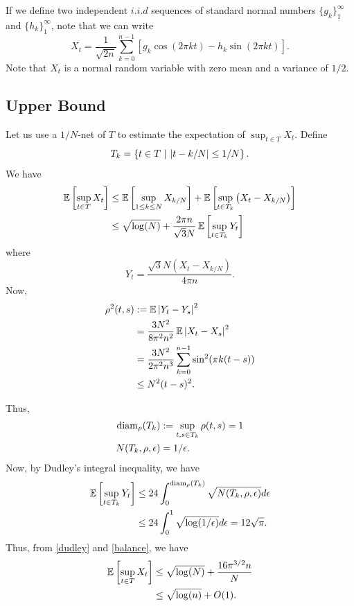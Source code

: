 If we define two independent $i.i.d$ sequences of standard normal numbers $\{ g_k\}_1^\infty$ and $\{h_k\}_1^\infty$, note that we can write
\begin{equation}
X_t = \frac{1}{\sqrt{2 n}} \sum_{k=0}^{n-1} \left[ g_k \cos(2 \pi k t) - h_k \sin(2\pi k t) \right].
\end{equation}
Note that $X_t$ is a normal random variable with zero mean and a variance of $1/2$. 

\subsection{Upper Bound}
Let us use a $1/N$-net of $T$ to estimate the expectation of  $\sup_{t \in T} {X_t}$. Define
\begin{equation}
T_k = \left\{t \in T ~ \middle| ~ \left|t-k/N\right| \leq 1/N \right\}.
\end{equation}
We have
\begin{align}
\operatorname{\mathbb{E}}\left[\sup_{t \in T} X_t \right] & \leq \operatorname{\mathbb{E}}\left[\sup_{1 \leq k \leq N} X_{k/N} \right] + \operatorname{\mathbb{E}}\left[\sup_{t \in T_k} \left(X_{t} - X_{k/N}\right) \right]\\
& \leq \sqrt{\log(N)} + \frac{2 \pi n}{\sqrt{3}N} \operatorname{\mathbb{E}}\left[\sup_{t \in T_k} Y_t \right]\label{balance}
\end{align}
where 
\begin{equation}
Y_t = \frac{\sqrt{3} N  \left(X_t - X_{k/N}\right)}{4 \pi n}.
\end{equation}
Now,
\begin{align}
\rho^2(t,s) & := \operatorname{\mathbb{E}} \left|Y_t - Y_s\right|^2\\
& = \frac{3 N^2}{8 \pi^2 n^2} \operatorname{\mathbb{E}} \left|X_t - X_s\right|^2\\
& = \frac{3 N^2}{2 \pi^2 n^3} \sum_{k=0}^{n-1}{\sin^2(\pi k (t - s))}\\
& \leq N^2 (t-s)^2.
\end{align}

Thus,
\begin{align}
\operatorname{diam}_\rho(T_k) &:= \sup_{t,s  \in T_k}\rho(t,s) = 1\\
N(T_k, \rho, \epsilon) & = 1/\epsilon.
\end{align}
Now, by Dudley's integral inequality, we have
\begin{align}
\operatorname{\mathbb{E}}\left[\sup_{t \in T_k} Y_t \right] & \leq 24 \int_0^{\operatorname{diam}_\rho(T_k)} \sqrt{N(T_k, \rho, \epsilon)} d\epsilon\\
 & \leq 24 \int_0^1 \sqrt{\log(1/\epsilon)} d\epsilon = 12 \sqrt{\pi}. \label{dudley}
\end{align}
Thus, from \eqref{dudley} and \eqref{balance}, we have
\begin{align}
\operatorname{\mathbb{E}}\left[\sup_{t \in T} X_t \right] & \leq  \sqrt{\log(N)} +  \frac{ 16 \pi^{3/2} n} { N}\\
& \leq \sqrt{\log(n)} + O(1).
\end{align}

